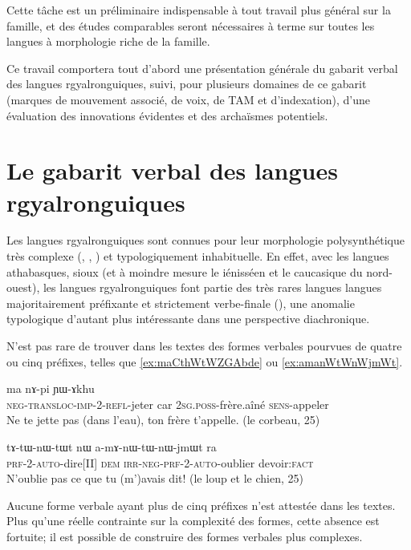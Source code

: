 \documentclass[oldfontcommands,oneside,a4paper,11pt]{article}
\newcommand{\ipa}[1]{{\phon \mbox{#1}}} %
\begin{document}
Cette tâche est un préliminaire indispensable à tout travail plus général sur la famille, et des études comparables seront nécessaires à terme  sur toutes les langues à morphologie riche de la famille.


Ce travail comportera tout d'abord une présentation générale du gabarit verbal des langues rgyalronguiques, suivi, pour plusieurs domaines de ce gabarit (marques de mouvement associé, de voix, de TAM et d'indexation), d'une évaluation des innovations évidentes et des archaïsmes potentiels.

\section{Le gabarit verbal des langues rgyalronguiques}
Les langues rgyalronguiques sont connues pour leur morphologie polysynthétique très complexe (\citealt{jacques12incorp}, \citealt{lai13affixale}, \citealt{jackson14morpho}) et typologiquement inhabituelle. En effet, avec les langues athabasques, sioux (et à moindre mesure le iénisséen  et le caucasique du nord-ouest), les langues rgyalronguiques font partie des très rares langues langues majoritairement préfixante et strictement verbe-finale (\citealt{jacques13harmonization}), une anomalie typologique d'autant plus intéressante dans une perspective diachronique.
 
N'est pas rare de trouver dans les textes des formes verbales pourvues de quatre ou cinq préfixes, telles que \ref{ex:maCthWtWZGAbde} ou \ref{ex:amanWtWnWjmWt}. 


\begin{exe}
\ex \label{ex:maCthWtWZGAbde}
\gll \ipa{ma-ɕ-thɯ-tɯ-ʑɣɤ-βde}  	\ipa{ma}  	\ipa{nɤ-pi}  	\ipa{ɲɯ-ɤkhu}  \\
\textsc{neg-transloc-imp-2-refl}-jeter car \textsc{2sg.poss}-frère.aîné \textsc{sens}-appeler \\
\glt Ne te jette pas (dans l'eau), ton frère t'appelle. (le corbeau, 25)
\end{exe}
\begin{exe}
\ex  \label{ex:amanWtWnWjmWt}
\gll
\ipa{tɤ-tɯ-nɯ-tɯt}  	\ipa{nɯ}  	\ipa{a-mɤ-nɯ-tɯ-nɯ-jmɯt}  	\ipa{ra}  \\
\textsc{prf-2-auto}-dire[II] \textsc{dem} \textsc{irr-neg-prf-2-auto}-oublier devoir:\textsc{fact} \\
\glt N'oublie pas ce que tu (m')avais dit! (le loup et le chien, 25)
\end{exe}

Aucune forme verbale ayant plus de cinq préfixes n'est attestée dans les textes. Plus qu'une réelle contrainte sur la complexité des formes, cette absence est fortuite; il est possible de construire des formes verbales plus complexes. 
\end{document}
